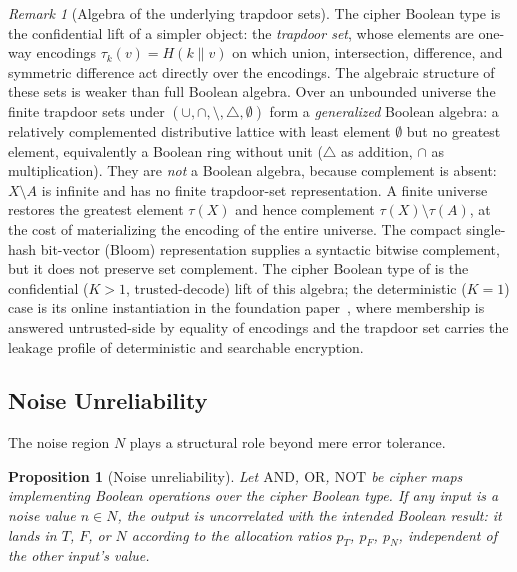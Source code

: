 \documentclass[11pt]{article}
\theoremstyle{definition}
\theoremstyle{plain}
\newtheorem{proposition}[theorem]{Proposition}
\theoremstyle{remark}
\newtheorem{remark}{Remark}[section]
\begin{document}
\begin{remark}[Algebra of the underlying trapdoor sets]
\label{rem:trapdoor-set-algebra}
The cipher Boolean type is the confidential lift of a simpler object: the
\emph{trapdoor set}, whose elements are one-way encodings
$\tau_k(v) = H(k \mathbin{\|} v)$ on which union, intersection, difference,
and symmetric difference act directly over the encodings.  The algebraic
structure of these sets is weaker than full Boolean algebra.  Over an
unbounded universe the finite trapdoor sets under
$(\cup, \cap, \setminus, \triangle, \emptyset)$ form a \emph{generalized}
Boolean algebra: a relatively complemented distributive lattice with least
element $\emptyset$ but no greatest element, equivalently a Boolean ring
without unit ($\triangle$ as addition, $\cap$ as multiplication).  They are
\emph{not} a Boolean algebra, because complement is absent:
$X \setminus A$ is infinite and has no finite trapdoor-set representation.
A finite universe restores the greatest element $\tau(X)$ and hence
complement $\tau(X) \setminus \tau(A)$, at the cost of materializing the
encoding of the entire universe.  The compact single-hash bit-vector
(Bloom) representation supplies a syntactic bitwise complement, but it does
not preserve set complement.  The cipher Boolean type of
 is the confidential ($K > 1$, trusted-decode) lift
of this algebra; the deterministic ($K = 1$) case is its online
instantiation in the foundation paper~\cite{towell2026cipher}, where
membership is answered untrusted-side by equality of encodings and the
trapdoor set carries the leakage profile of deterministic and searchable
encryption.
\end{remark}


\subsection{Noise Unreliability}
\label{sec:noise-unreliability}

The noise region $N$ plays a structural role beyond mere error tolerance.

\begin{proposition}[Noise unreliability]
\label{prop:noise-unreliability}
Let $\mathrm{AND}$, $\mathrm{OR}$, $\mathrm{NOT}$ be cipher maps
implementing Boolean operations over the cipher Boolean type.
If any input is a noise value $n \in N$, the output is \emph{uncorrelated}
with the intended Boolean result: it lands in $T$, $F$, or $N$ according
to the allocation ratios $p_T$, $p_F$, $p_N$, independent of the other
input's value.
\end{proposition}
\end{document}
